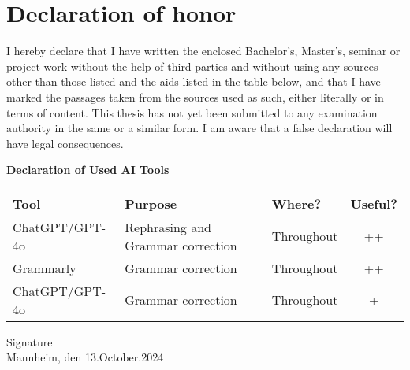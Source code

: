 \documentclass[a4paper,oneside,bibliography=totoc]{scrbook}
\begin{document}
\backmatter

\chapter{Declaration of honor}\label{ch:declaration-of-honor}
I hereby declare that I have written the enclosed Bachelor's, Master's,
seminar or project work without the help of third parties and without using any sources other than those listed and the aids listed in the table below,
and that I have marked the passages taken from the sources used as such, either literally or in terms of content.
This thesis has not yet been submitted to any examination authority in the same or a similar form.
I am aware that a false declaration will have legal consequences.

\begin{center}
    \textbf{Declaration of Used AI Tools} \\[.3em]
    \begin{tabularx}{\textwidth}{lXlc}
        \toprule
        Tool        & Purpose                       & Where?
        & Useful? \\
        \midrule
        ChatGPT/GPT-4o     & Rephrasing and Grammar correction                  & Throughout                    & ++       \\
        Grammarly   & Grammar correction            & Throughout                    & ++       \\
        ChatGPT/GPT-4o     & Grammar correction               & Throughout     & +        \\
        \bottomrule
    \end{tabularx}
\end{center}
\vspace{2cm}
\noindent Signature\\
\noindent Mannheim, den 13.October.2024 \hfill
\end{document}

